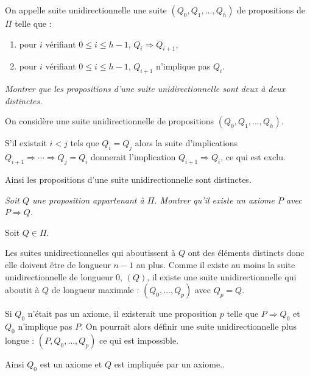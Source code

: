 \medskip

On appelle suite unidirectionnelle une suite $(Q_{0}, Q_{1}, \ldots, Q_{h})$ de propositions de $\Pi$ telle que :
\begin{enumerate}
\item pour $i$ vérifiant $0\le i\le h-1$, $Q_{i} \Rightarrow Q_{i+1}$,
\item pour $i$ vérifiant $0\le i\le h-1$, $Q_{i+1}$ n'implique pas $Q_{i}$.
\end{enumerate}
\begin{Exercise}\it
Montrer que les propositions d'une suite unidirectionnelle sont deux à deux distinctes. 
\end{Exercise}
\begin{Answer}

On considère une suite  unidirectionnelle de propositions 
$(Q_{0},Q_{1},...,Q_{h})$.

S'il existait $i< j$ tels que $Q_i = Q_j$ alors la suite d'implications 
$Q_{i+1}\Rightarrow \cdots \Rightarrow Q_{j} = Q_i$ donnerait l'implication $Q_{i+1}\Rightarrow Q_i$, ce qui est exclu.

Ainsi les propositions d'une suite  unidirectionnelle sont distinctes.
\end{Answer}
\begin{Exercise}\it
Soit $Q$ une proposition appartenant à $\Pi$.
Montrer qu'il existe un axiome $P$ avec $P \Rightarrow Q$.
\end{Exercise}
\begin{Answer}
Soit $Q\in \Pi$. 

Les suites unidirectionnelles qui aboutissent à $Q$ ont des éléments distincts donc elle doivent être de longueur $n-1$ au plus. Comme il existe au moins la suite unidirectionnelle de longueur 0, $(Q)$, il existe une suite unidirectionnelle qui aboutit à $Q$ de longueur maximale :  $(Q_{0},...,Q_{p})$ avec $Q_p=Q$.


Si $Q_0$ n'était pas un axiome, il existerait une proposition $p$ telle que $P \Rightarrow Q_0$ et $Q_0$ n'implique pas $P$.  On pourrait alors définir une suite unidirectionnelle plus longue : $(P, Q_{0},...,Q_{p})$ ce qui est impossible.

Ainsi $Q_0$ est un axiome et $Q$ est impliquée par un axiome..
\end{Answer}
